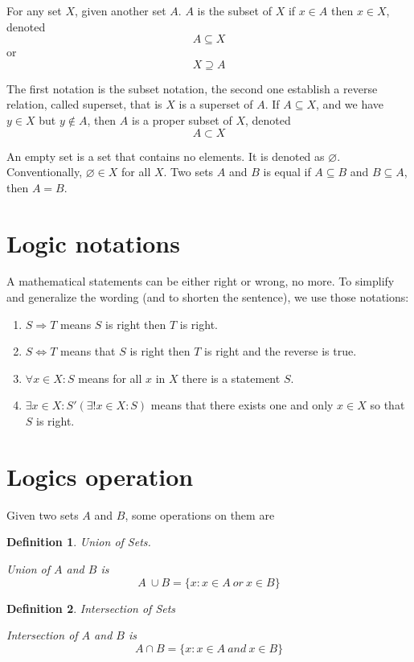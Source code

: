 \documentclass{book}
\newtheorem{Definition}{Definition}[section]
\numberwithin{identity}{subsection}
\numberwithin{Rule}{subsection}
\numberwithin{Theorem}{subsection}
\numberwithin{Definition}{subsection}
\begin{document}
For any set $X$, given another set $A$. $A$ is the subset of $X$ if $x\in A$ then $x \in X$, denoted $$A \subseteq X$$ or $$X \supseteq A$$

The first notation is the subset notation, the second one establish a reverse relation, called superset, that is $X$ is a superset of $A$. If $A \subseteq X$, and we have $y \in X$ but $y \notin A$, then $A$ is a proper subset of $X$, denoted $$A\subset X$$

An empty set is a set that contains no elements. It is denoted as $\varnothing$. Conventionally, $\varnothing \in X$ for all $X$. 
\vspace{3mm}
Two sets $A$ and $B$ is equal if $A \subseteq B$ and $B \subseteq A$, then $A = B$. 

\section{Logic notations}

A mathematical statements can be either right or wrong, no more. To simplify and generalize the wording (and to shorten the sentence), we use those notations: 
\begin{enumerate}
    \item $S \Rightarrow T$ means $S$ is right then $T$ is right.
    \item $S \iff T$ means that $S$ is right then $T$ is right and the reverse is true. 
    \item $\forall x \in X: S$ means for all $x$ in $X$ there is a statement $S$.
    \item $\exists x \in X:S'(\exists! x \in X: S)$ means that there exists one and only $x \in X$ so that $S$ is right.
\end{enumerate}

\section{Logics operation}
Given two sets $A$ and $B$, some operations on them are

\begin{Definition}
    Union of Sets.

    Union of $A$ and $B$ is $$A\: \cup B = \{x: x \in A \: or \: x \in B\}$$
\end{Definition}

\begin{Definition}
    Intersection of Sets

    Intersection of $A$ and $B$ is $$A \cap B = \{x:x\in A \: and \: x \in B\}$$
\end{Definition}
\end{document}
